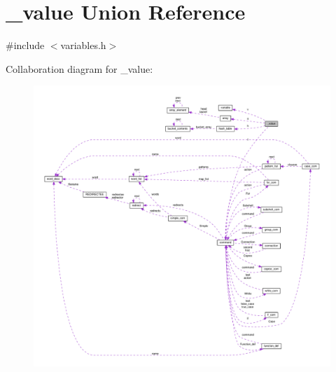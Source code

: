 \hypertarget{union__value}{}\section{\+\_\+value Union Reference}
\label{union__value}


{\ttfamily \#include $<$variables.\+h$>$}



Collaboration diagram for \+\_\+value\+:
\nopagebreak
\begin{figure}[H]
\begin{center}
\leavevmode
\includegraphics[width=350pt]{union__value__coll__graph}
\end{center}
\end{figure}
